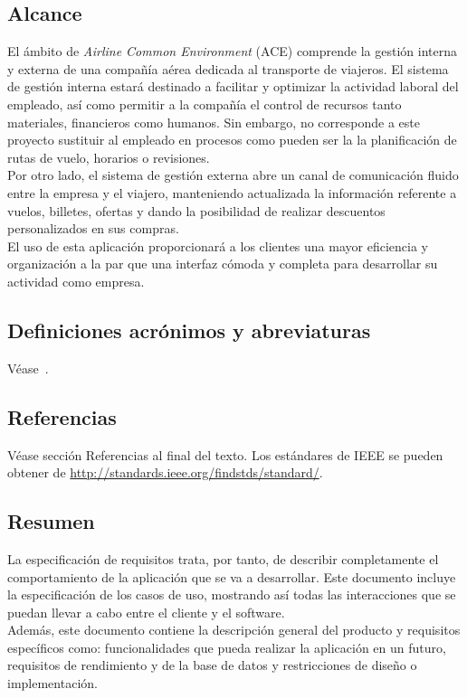 \documentclass[11pt, a4paper, twoside]{report}
\begin{document}
		\subsection{Alcance}
			El ámbito de \textit{Airline Common Environment}  (\gls{ACE}) comprende la gestión interna y externa de una compañía aérea dedicada al transporte de viajeros. El sistema de gestión interna estará destinado a facilitar y optimizar la actividad laboral del empleado, así como permitir a la compañía el control de recursos tanto materiales, financieros como humanos. Sin embargo, no corresponde a este proyecto sustituir al empleado en procesos como pueden ser la la planificación de rutas de vuelo, horarios o revisiones. \\

			Por otro lado, el sistema de gestión externa abre un canal de comunicación fluido entre la empresa y el viajero, manteniendo actualizada la información referente a vuelos, billetes, ofertas y dando la posibilidad de realizar descuentos personalizados en sus compras.\\

			El uso de esta aplicación proporcionará a los clientes una mayor eficiencia y organización a la par que una interfaz cómoda y completa para desarrollar su actividad como empresa. 
			
		\subsection{Definiciones acrónimos y abreviaturas}
			Véase~.
		\subsection{Referencias}
			Véase sección Referencias al final del texto. Los estándares de IEEE se pueden obtener de \url{http://standards.ieee.org/findstds/standard/}.
		\subsection{Resumen}
			La especificación de requisitos trata, por tanto, de describir completamente el comportamiento de la aplicación que se va a desarrollar. Este documento incluye la especificación de los casos de uso, mostrando así todas las interacciones que se puedan llevar a cabo entre el cliente y el software. \\

			Además, este documento contiene la descripción general del producto y requisitos específicos como: funcionalidades que pueda realizar la aplicación en un futuro, requisitos de rendimiento y de la base de datos y restricciones de diseño o implementación.
			
\end{document}
